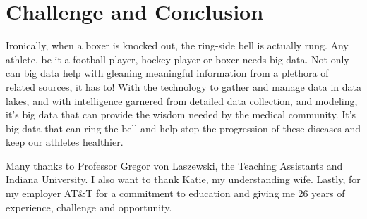 \documentclass[sigconf]{acmart}
\begin{document}
\section{Challenge and Conclusion}

Ironically, when a boxer is knocked out, the ring-side bell is actually rung.  Any athlete, be it a football player, hockey player or boxer needs big data.  Not only can big data help with gleaning meaningful information from a plethora of related sources, it has to!  With the technology to gather and manage data in data lakes, and with intelligence garnered from detailed data collection, and modeling, it's big data that can provide the wisdom needed by the medical community.  It's big data that can ring the bell and help stop the progression of these diseases and keep our athletes healthier.  



\begin{acks}

Many thanks to Professor Gregor von Laszewski, the Teaching Assistants and Indiana University. I also want to thank Katie, my understanding wife.  Lastly, for my employer AT\&T for a commitment to education and giving me 26 years of experience, challenge and opportunity.

\end{acks}




 
\end{document}
